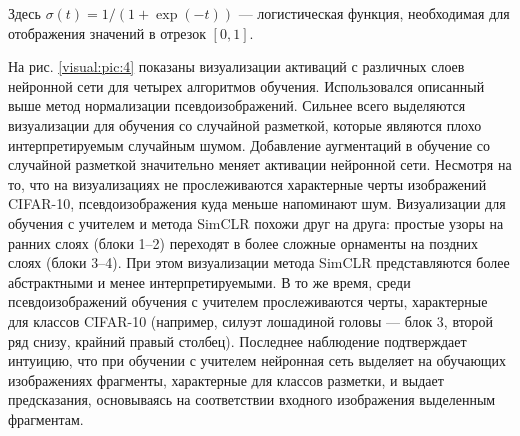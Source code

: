 \noindent
Здесь $\sigma(t)=1/(1+\exp(-t))$ --- логистическая функция, необходимая для отображения значений в отрезок $[0, 1]$.

На рис. \ref{visual:pic:4} показаны визуализации активаций с различных слоев нейронной сети для четырех алгоритмов обучения. Использовался описанный выше метод нормализации псевдоизображений. Сильнее всего выделяются визуализации для обучения со случайной разметкой, которые являются плохо интерпретируемым случайным шумом. Добавление аугментаций в обучение со случайной разметкой значительно меняет активации нейронной сети. Несмотря на то, что на визуализациях не прослеживаются характерные черты изображений CIFAR-10, псевдоизображения куда меньше напоминают шум. Визуализации для обучения с учителем и метода SimCLR похожи друг на друга: простые узоры на ранних слоях (блоки 1--2) переходят в более сложные орнаменты на поздних слоях (блоки 3--4). При этом визуализации метода SimCLR представляются более абстрактными и менее интерпретируемыми. В то же время, среди псевдоизображений обучения с учителем прослеживаются черты, характерные для классов CIFAR-10 (например, силуэт лошадиной \linebreak головы --- блок 3, второй ряд снизу, крайний правый столбец). Последнее наблюдение подтверждает интуицию, что при обучении с учителем нейронная сеть выделяет на обучающих изображениях фрагменты, характерные для классов разметки, и выдает предсказания, основываясь на соответствии входного изображения выделенным фрагментам.

